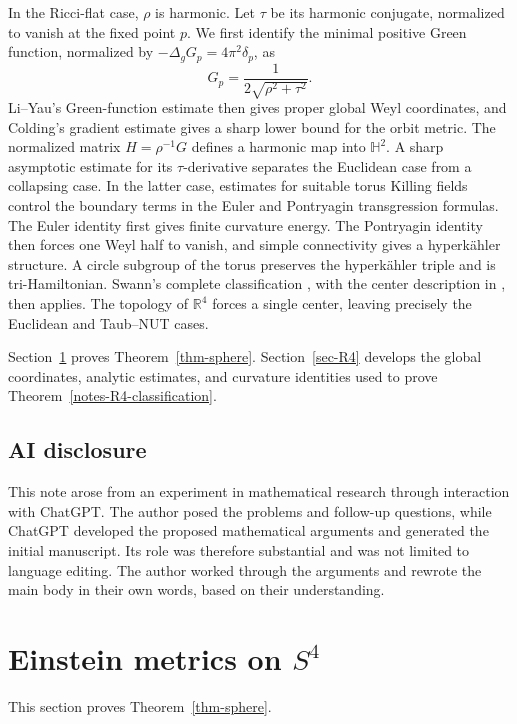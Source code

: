 \documentclass[letterpaper]{amsart}
\theoremstyle{definition}
\theoremstyle{remark}
\begin{document}
In the Ricci-flat case, $\rho$ is harmonic. Let $\tau$ be its harmonic
conjugate, normalized to vanish at the fixed point $p$. We first identify
the minimal positive Green function, normalized by
$-\Delta_g G_p=4\pi^2\delta_p$, as
\[
 G_p=\frac{1}{2\sqrt{\rho^2+\tau^2}}.
\]
Li--Yau's Green-function estimate \cite{notes-LiYau} then gives proper
global Weyl coordinates, and Colding's gradient estimate
\cite{notes-Colding} gives a sharp lower bound for the orbit metric.
The normalized matrix $H=\rho^{-1}G$ defines a harmonic map into
$\mathbb H^2$. A sharp asymptotic estimate for its $\tau$-derivative separates the
Euclidean case from a collapsing case. In the latter case, estimates for
suitable torus Killing fields control the boundary terms in the Euler
and Pontryagin transgression formulas. The Euler identity first gives
finite curvature energy. The Pontryagin identity then forces one Weyl
half to vanish, and simple connectivity gives a hyperk\"ahler structure.
A circle subgroup of the torus preserves the hyperk\"ahler triple and is
tri-Hamiltonian. Swann's complete classification
\cite[Theorem~3.1]{notes-Swann}, with the center description in
\cite[Section~2.2]{notes-DancerSwann}, then applies. The topology of
$\mathbb R^4$ forces a single center, leaving precisely the Euclidean
and Taub--NUT cases.

Section~\ref{sec-sphere} proves Theorem~\ref{thm-sphere}.
Section~\ref{sec-R4} develops the global coordinates, analytic estimates,
and curvature identities used to prove Theorem~\ref{notes-R4-classification}.

\subsection*{AI disclosure}
This note arose from an experiment in mathematical research through
interaction with ChatGPT. The author posed the problems and follow-up
questions, while ChatGPT developed the proposed mathematical arguments
and generated the initial manuscript. Its role was therefore substantial
and was not limited to language editing.
The author worked through the arguments and rewrote the main body in their own words, based on their understanding.


\section{\texorpdfstring{Einstein metrics on $S^4$}{Einstein metrics on S4}}\label{sec-sphere}
This section proves Theorem~\ref{thm-sphere}.
\end{document}
